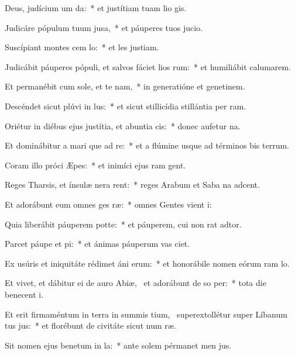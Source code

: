 \item Deus, judícium um  da:~* et justítiam tuam lio gis.
\item Judicáre pópulum tuum  jusa,~* et páuperes tuos  jucio.
\item Suscípiant montes cem lo:~* et les justiam.
\item Judicábit páuperes pópuli, et salvos fáciet lios rum:~* et humiliábit calumarem.
\item Et permanébit cum sole, et te nam,~* in generatióne et genetinem.
\item Descéndet sicut plúvi in lus:~* et sicut stillicídia stillántia per ram.
\item Oriétur in diébus ejus justítia, et abuntia cis:~* donec aufetur na.
\item Et dominábitur a mari que ad re:~* et a flúmine usque ad términos bis terrum.
\item Coram illo próci Æpes:~* et inimíci ejus ram gent.
\item Reges Tharsis, et ínsulæ nera rent:~* reges Arabum et Saba na adcent.
\item Et adorábunt eum omnes ges ræ:~* omnes Gentes vient i:
\item Quia liberábit páuperem  potte:~* et páuperem, cui non rat adtor.
\item Parcet páupe et pi:~* et ánimas páuperum vas ciet.
\item Ex usúris et iniquitáte rédimet áni erum:~* et honorábile nomen eórum ram lo.
\item Et vivet, et dábitur ei de auro Abiæ,~\pscross{} et adorábunt de so per:~* tota die benecent i.
\item Et erit firmaméntum in terra in summis tium,~\pscross{} superextollétur super Líbanum tus jus:~* et florébunt de civitáte sicut num ræ.
\item Sit nomen ejus benetum in la:~* ante solem pérmanet men jus.

